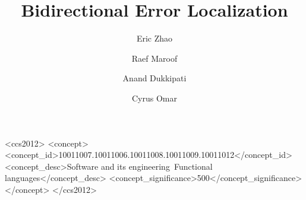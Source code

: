 \documentclass[acmsmall, screen]{acmart}
\begin{document}
\title{Bidirectional Error Localization}

\author{Eric Zhao}

\author{Raef Maroof}

\author{Anand Dukkipati}

\author{Cyrus Omar}



\begin{CCSXML}
<ccs2012>
  <concept>
    <concept_id>10011007.10011006.10011008.10011009.10011012</concept_id>
    <concept_desc>Software and its engineering~Functional languages</concept_desc>
    <concept_significance>500</concept_significance>
  </concept>
</ccs2012>
\end{CCSXML}



\maketitle







\end{document}
